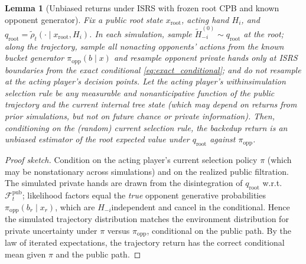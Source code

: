 \documentclass[10pt]{article}
\newcommand{\1}{\mathbf{1}}
\theoremstyle{plain}
\newtheorem{lemma}{Lemma}
\begin{document}
\begin{lemma}[Unbiased returns under IS\textendash RS with frozen root CPB and known opponent generator]
\label{lem:isrs}
Fix a public root state $x_{\mathrm{root}}$, acting hand $H_i$, and $q_{\mathrm{root}}=\tilde\rho_t(\cdot\mid x_{\mathrm{root}},H_i)$. In each simulation, sample $\tilde H_{-i}^{(0)}\sim q_{\mathrm{root}}$ at the root; along the trajectory, sample all non\textendash acting opponents’ actions from the known bucket generator $\pi_{\mathrm{opp}}(b\mid x)$ and resample opponent private hands only at IS\textendash RS boundaries from the exact conditional \eqref{eq:exact_conditional}; and do not resample at the acting player’s decision points. Let the acting player’s within\textendash simulation selection rule be any measurable and non\textendash anticipative function of the public trajectory and the current internal tree state (which may depend on returns from prior simulations, but not on future chance or private information). Then, conditioning on the (random) current selection rule, the backed\textendash up return is an unbiased estimator of the root expected value under $q_{\mathrm{root}}$ against $\pi_{\mathrm{opp}}$.
\end{lemma}
\begin{proof}[Proof sketch]
Condition on the acting player’s current selection policy $\pi$ (which may be nonstationary across simulations) and on the realized public filtration. The simulated private hands are drawn from the disintegration of $q_{\mathrm{root}}$ w.r.t.\ $\mathcal{F}^{\mathrm{pub}}_t$; likelihood factors equal the \emph{true} opponent generative probabilities $\pi_{\mathrm{opp}}(b_r\mid x_r)$, which are $H_{-i}$\textendash independent and cancel in the conditional. Hence the simulated trajectory distribution matches the environment distribution for private uncertainty under $\pi$ versus $\pi_{\mathrm{opp}}$, conditional on the public path. By the law of iterated expectations, the trajectory return has the correct conditional mean given $\pi$ and the public path.
\end{proof}
\end{document}
